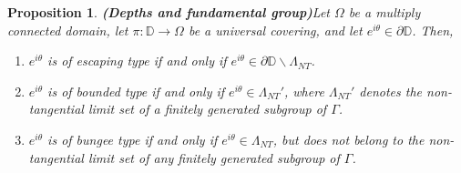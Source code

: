 \documentclass[11pt,a4paper,reqno]{amsart}
\theoremstyle{plain}
\newtheorem{prop}[thm]{Proposition}
\theoremstyle{definition}
\theoremstyle{plain}
\def\DD{\mathbb{D}}
\renewcommand{\setminus}{\smallsetminus}
\begin{document}
\begin{prop}{\bf (Depths and fundamental group)}\label{prop:type-group}
Let $\Omega$ be a multiply connected domain, let $\pi\colon\DD\to\Omega$ be a universal covering, and let $e^{i\theta}\in\partial\DD$. Then,
\begin{enumerate}[label={\em (\alph*)}]
	\item $e^{i\theta}$ is of escaping type if and only if $e^{i\theta}\in\partial\DD\setminus\Lambda_{NT}$.
	\item $e^{i\theta}$ is of bounded type if and only if $e^{i\theta}\in\Lambda_{NT}'$, where $\Lambda_{NT}'$ denotes the non-tangential limit set of a finitely generated subgroup of $\Gamma$.
	\item $e^{i\theta}$ is of bungee type if and only if $e^{i\theta}\in\Lambda_{NT}$, but does not belong to the non-tangential limit set of any finitely generated subgroup of $\Gamma$.
\end{enumerate}
\end{prop}
\end{document}
